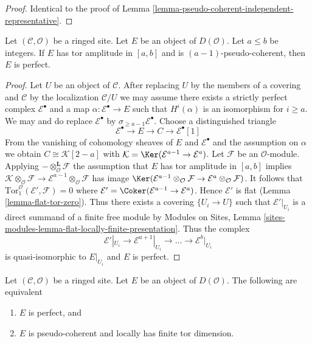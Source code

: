 \begin{proof}
Identical to the proof of
Lemma \ref{lemma-pseudo-coherent-independent-representative}.
\end{proof}

\begin{lemma}
\label{lemma-perfect-precise}
Let $(\mathcal{C}, \mathcal{O})$ be a ringed site.
Let $E$ be an object of $D(\mathcal{O})$.
Let $a \leq b$ be integers. If $E$ has tor amplitude in $[a, b]$
and is $(a - 1)$-pseudo-coherent, then $E$ is perfect.
\end{lemma}

\begin{proof}
Let $U$ be an object of $\mathcal{C}$. After replacing $U$ by the members
of a covering and $\mathcal{C}$ by the localization $\mathcal{C}/U$
we may assume there exists a strictly perfect complex $\mathcal{E}^\bullet$
and a map $\alpha : \mathcal{E}^\bullet \to E$ such that $H^i(\alpha)$ is
an isomorphism for $i \geq a$. We may and do replace
$\mathcal{E}^\bullet$ by $\sigma_{\geq a - 1}\mathcal{E}^\bullet$. Choose a
distinguished triangle
$$
\mathcal{E}^\bullet \to E \to C \to \mathcal{E}^\bullet[1]
$$
From the vanishing of cohomology sheaves of $E$ and $\mathcal{E}^\bullet$
and the assumption on $\alpha$ we obtain $C \cong \mathcal{K}[2 - a]$ with
$\mathcal{K} = \Ker(\mathcal{E}^{a - 1} \to \mathcal{E}^a)$.
Let $\mathcal{F}$ be an $\mathcal{O}$-module.
Applying $- \otimes_\mathcal{O}^\mathbf{L} \mathcal{F}$
the assumption that $E$ has tor amplitude in $[a, b]$
implies $\mathcal{K} \otimes_\mathcal{O} \mathcal{F} \to
\mathcal{E}^{a - 1} \otimes_\mathcal{O} \mathcal{F}$ has image
$\Ker(\mathcal{E}^{a - 1} \otimes_\mathcal{O} \mathcal{F}
\to \mathcal{E}^a \otimes_\mathcal{O} \mathcal{F})$.
It follows that $\text{Tor}_1^\mathcal{O}(\mathcal{E}', \mathcal{F}) = 0$
where $\mathcal{E}' = \Coker(\mathcal{E}^{a - 1} \to \mathcal{E}^a)$.
Hence $\mathcal{E}'$ is flat (Lemma \ref{lemma-flat-tor-zero}).
Thus there exists a covering $\{U_i \to U\}$ such that
$\mathcal{E}'|_{U_i}$ is a direct summand of a finite free module by
Modules on Sites, Lemma
\ref{sites-modules-lemma-flat-locally-finite-presentation}.
Thus the complex
$$
\mathcal{E}'|_{U_i} \to \mathcal{E}^{a + 1}|_{U_i} \to \ldots \to
\mathcal{E}^b|_{U_i}
$$
is quasi-isomorphic to $E|_{U_i}$ and $E$ is perfect.
\end{proof}

\begin{lemma}
\label{lemma-perfect}
Let $(\mathcal{C}, \mathcal{O})$ be a ringed site.
Let $E$ be an object of $D(\mathcal{O})$.
The following are equivalent
\begin{enumerate}
\item $E$ is perfect, and
\item $E$ is pseudo-coherent and locally has finite tor dimension.
\end{enumerate}
\end{lemma}

